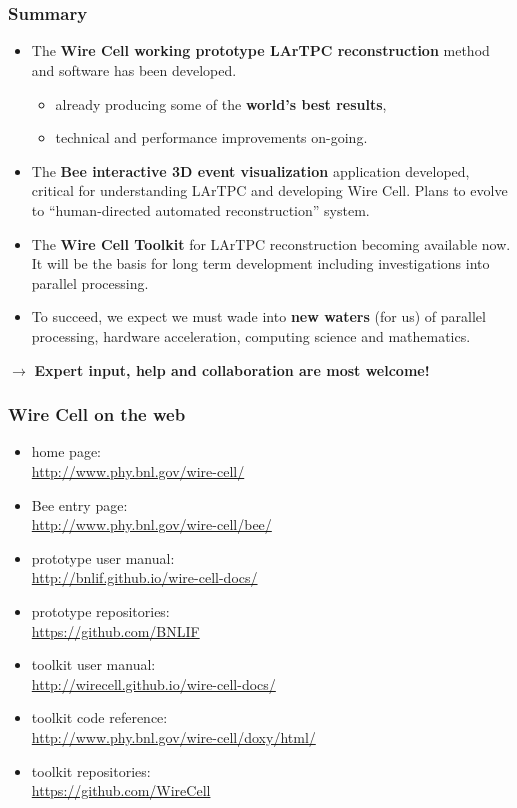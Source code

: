 

\section{}

\begin{frame}
  \frametitle{Summary}
  \footnotesize
  \begin{itemize}
  \item The \textbf{Wire Cell working prototype LArTPC reconstruction} method and software has been developed.
    \begin{itemize}  \footnotesize
    \item already producing some of the \textbf{world's best results},
    \item technical and performance improvements on-going.
    \end{itemize}
  \item The \textbf{Bee interactive 3D event visualization}
    application developed, critical for understanding LArTPC and
    developing Wire Cell.  Plans to evolve to ``human-directed
    automated reconstruction'' system.
  \item The \textbf{Wire Cell Toolkit} for LArTPC reconstruction
    becoming available now. It will be the basis for long term development
    including investigations into parallel processing.
  \item To succeed, we expect we must wade into \textbf{new waters}
    (for us) of parallel processing, hardware acceleration, computing
    science and mathematics.
  \end{itemize}

  \begin{center}
    $\rightarrow$ \textbf{Expert input, help and collaboration are
      most welcome!}
  \end{center}
\end{frame}

\begin{frame}
  \frametitle{Wire Cell on the web}

  \begin{itemize}
  \item home page: \\ \url{http://www.phy.bnl.gov/wire-cell/}
  \item Bee entry page: \\ \url{http://www.phy.bnl.gov/wire-cell/bee/}
  \item prototype user manual: \\ \url{http://bnlif.github.io/wire-cell-docs/}
  \item prototype repositories: \\ \url{https://github.com/BNLIF}
  \item toolkit user manual: \\ \url{http://wirecell.github.io/wire-cell-docs/}
  \item toolkit code reference: \\ \url{http://www.phy.bnl.gov/wire-cell/doxy/html/}
  \item toolkit repositories: \\ \url{https://github.com/WireCell}
  \end{itemize}
\end{frame}
